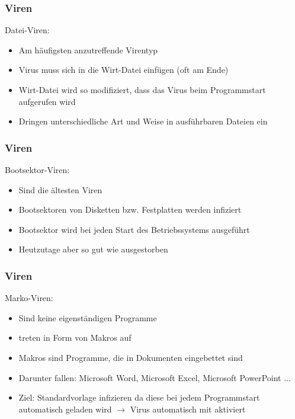 \documentclass{beamer}
\begin{document}
\begin{frame}
	\frametitle{Viren}
		\begin{block}{Datei-Viren:}
			\begin{itemize}
				\item Am häufigsten anzutreffende Virentyp
				\item Virus muss sich in die Wirt-Datei einfügen (oft am Ende)
				\item Wirt-Datei wird so modifiziert, dass das Virus beim Programmstart aufgerufen wird
				\item Dringen unterschiedliche Art und Weise in ausführbaren Dateien ein
			\end{itemize}
		\end{block}
\end{frame}

\begin{frame}
	\frametitle{Viren}
		\begin{block}{Bootsektor-Viren:}
			\begin{itemize}
				\item Sind die ältesten Viren
				\item Bootsektoren von Disketten bzw. Festplatten werden infiziert
				\item Bootsektor wird bei jeden Start des Betriebssystems ausgeführt
				\item Heutzutage aber so gut wie ausgestorben
			\end{itemize}
		\end{block}
\end{frame}

\begin{frame}
	\frametitle{Viren}
		\begin{block}{Marko-Viren:}
			\begin{itemize}
				\item Sind keine eigenständigen Programme
				\item treten in Form von Makros auf
				\item Makros sind Programme, die in Dokumenten eingebettet sind
				\item Darunter fallen: Microsoft Word, Microsoft Excel, Microsoft PowerPoint ...
				\item Ziel: Standardvorlage infizieren da diese bei jedem Programmstart automatisch geladen wird $\rightarrow$ Virus automatisch mit aktiviert
			\end{itemize}
		\end{block}
\end{frame}
\end{document}
